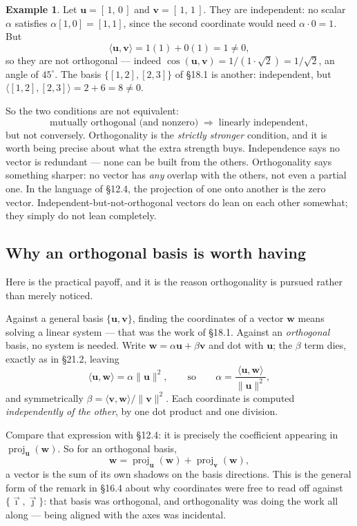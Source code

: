 \documentclass[11pt]{article}
\theoremstyle{definition}
\newtheorem{ex}{Example}[section]
\theoremstyle{remark}
\newcommand{\vc}[1]{\mathbf{#1}}
\newcommand{\norm}[1]{\lVert #1\rVert}
\newcommand{\proj}[2]{\operatorname{proj}_{#1}(#2)}
\newcommand{\ivec}{\vec{\imath}}
\newcommand{\jvec}{\vec{\jmath}}
\begin{document}
\begin{ex}
Let $\vc{u}=[\,1,\,0\,]$ and $\vc{v}=[\,1,\,1\,]$. They are independent: no
scalar $\alpha$ satisfies $\alpha[1,0]=[1,1]$, since the second coordinate would
need $\alpha\cdot0=1$. But
\[
  \langle\vc{u},\vc{v}\rangle = 1(1)+0(1) = 1 \neq 0 ,
\]
so they are not orthogonal --- indeed
$\cos(\vc{u},\vc{v}) = 1/(1\cdot\sqrt2) = 1/\sqrt2$, an angle of $45^{\circ}$.
The basis $\{[1,2],[2,3]\}$ of \S18.1 is another: independent, but
$\langle[1,2],[2,3]\rangle = 2+6 = 8 \neq 0$.
\end{ex}

\noindent So the two conditions are not equivalent:
\[
  \text{mutually orthogonal (and nonzero)}
  \;\Longrightarrow\;
  \text{linearly independent},
\]
but not conversely. Orthogonality is the \emph{strictly stronger} condition, and
it is worth being precise about what the extra strength buys. Independence says
no vector is redundant --- none can be built from the others. Orthogonality says
something sharper: no vector has \emph{any} overlap with the others, not even a
partial one. In the language of \S12.4, the projection of one onto another is
the zero vector. Independent-but-not-orthogonal vectors do lean on each other
somewhat; they simply do not lean completely.

\subsection{Why an orthogonal basis is worth having}
Here is the practical payoff, and it is the reason orthogonality is pursued
rather than merely noticed.

Against a general basis $\{\vc{u},\vc{v}\}$, finding the coordinates of a vector
$\vc{w}$ means solving a linear system --- that was the work of \S18.1. Against
an \emph{orthogonal} basis, no system is needed. Write
$\vc{w}=\alpha\vc{u}+\beta\vc{v}$ and dot with $\vc{u}$; the $\beta$ term dies,
exactly as in \S21.2, leaving
\[
  \langle\vc{u},\vc{w}\rangle = \alpha\norm{\vc{u}}^{2},
  \qquad\text{so}\qquad
  \alpha = \frac{\langle\vc{u},\vc{w}\rangle}{\norm{\vc{u}}^{2}} ,
\]
and symmetrically $\beta=\langle\vc{v},\vc{w}\rangle/\norm{\vc{v}}^{2}$. Each
coordinate is computed \emph{independently of the other}, by one dot product and
one division.

Compare that expression with \S12.4: it is precisely the coefficient appearing
in $\proj{\vc{u}}{\vc{w}}$. So for an orthogonal basis,
\[
  \vc{w} = \proj{\vc{u}}{\vc{w}} + \proj{\vc{v}}{\vc{w}} ,
\]
a vector is the sum of its own shadows on the basis directions. This is the
general form of the remark in \S16.4 about why coordinates were free to read off
against $\{\ivec,\jvec\}$: that basis was orthogonal, and orthogonality was
doing the work all along --- being aligned with the axes was incidental.
\end{document}
